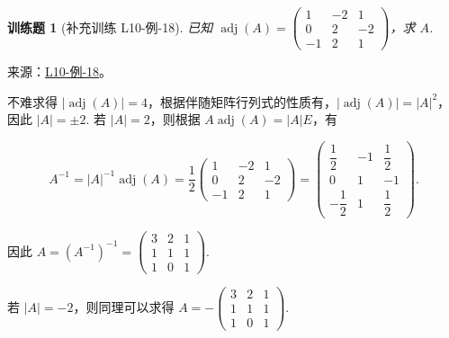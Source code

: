 \documentclass[UTF8,12pt,a4paper,fontset=fandol]{ctexart}
\newtheorem{exercise}{训练题}[section]
\begin{document}
\begin{exercise}[补充训练 L10-例-18]\label{prob:L10-例-18}
已知 $\operatorname{adj}(A)=\begin{pmatrix}
            1 & -2 & 1 \\ 0 & 2 & -2 \\ -1 & 2 & 1
        \end{pmatrix}$，求 $A$.
\end{exercise}
\noindent 来源：\href{https://github.com/yhwu-is/Linear-Algebra-Left-Undone/blob/new/%E8%AE%B2%E4%B9%89/%E4%B8%93%E9%A2%98/10%20%E8%A1%8C%E5%88%97%E5%BC%8F.tex}{L10-例-18}。
\begin{solve}
不难求得 $|\operatorname{adj}(A)| = 4$，根据伴随矩阵行列式的性质有，$|\operatorname{adj}(A)| = |A|^2$，因此 $|A| = \pm 2$. 若 $|A| = 2$，则根据 $A\operatorname{adj}(A) = |A|E$，有

    \[A^{-1} = |A|^{-1}\operatorname{adj}(A) = \frac{1}{2}\begin{pmatrix}
            1 & -2 & 1 \\ 0 & 2 & -2 \\ -1 & 2 & 1
        \end{pmatrix} = \begin{pmatrix}
            \dfrac{1}{2} & -1 & \dfrac{1}{2} \\ 0 & 1 & -1 \\ -\dfrac{1}{2} & 1 & \dfrac{1}{2}
        \end{pmatrix}.\]

    因此 $A = (A^{-1})^{-1} = \begin{pmatrix}
            3 & 2 & 1 \\ 1 & 1 & 1 \\ 1 & 0 & 1
        \end{pmatrix}$.

    若 $|A| = -2$，则同理可以求得 $A = -\begin{pmatrix}
            3 & 2 & 1 \\ 1 & 1 & 1 \\ 1 & 0 & 1
        \end{pmatrix}$.
\end{solve}
\end{document}
